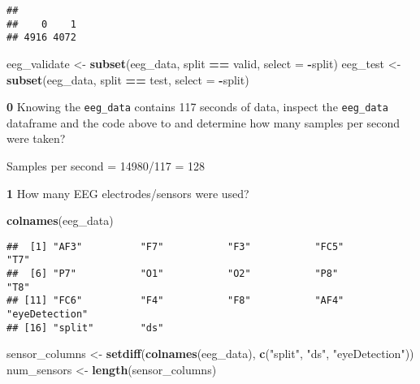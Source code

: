 \documentclass[
]{article}
\newenvironment{Shaded}{\begin{snugshade}}{\end{snugshade}}
\newcommand{\AttributeTok}[1]{\textcolor[rgb]{0.13,0.29,0.53}{#1}}
\newcommand{\FunctionTok}[1]{\textcolor[rgb]{0.13,0.29,0.53}{\textbf{#1}}}
\newcommand{\NormalTok}[1]{#1}
\newcommand{\OtherTok}[1]{\textcolor[rgb]{0.56,0.35,0.01}{#1}}
\newcommand{\SpecialCharTok}[1]{\textcolor[rgb]{0.81,0.36,0.00}{\textbf{#1}}}
\newcommand{\StringTok}[1]{\textcolor[rgb]{0.31,0.60,0.02}{#1}}
\begin{document}
\begin{verbatim}
## 
##    0    1 
## 4916 4072
\end{verbatim}

\begin{Shaded}
\begin{Highlighting}[]
\NormalTok{eeg\_validate }\OtherTok{\textless{}{-}} \FunctionTok{subset}\NormalTok{(eeg\_data, split }\SpecialCharTok{==} \StringTok{\textquotesingle{}valid\textquotesingle{}}\NormalTok{, }\AttributeTok{select =} \SpecialCharTok{{-}}\NormalTok{split)}
\NormalTok{eeg\_test }\OtherTok{\textless{}{-}} \FunctionTok{subset}\NormalTok{(eeg\_data, split }\SpecialCharTok{==} \StringTok{\textquotesingle{}test\textquotesingle{}}\NormalTok{, }\AttributeTok{select =} \SpecialCharTok{{-}}\NormalTok{split)}
\end{Highlighting}
\end{Shaded}

\textbf{0} Knowing the \texttt{eeg\_data} contains 117 seconds of data,
inspect the \texttt{eeg\_data} dataframe and the code above to and
determine how many samples per second were taken?

Samples per second = 14980/117 = 128

\textbf{1} How many EEG electrodes/sensors were used?

\begin{Shaded}
\begin{Highlighting}[]
\FunctionTok{colnames}\NormalTok{(eeg\_data)}
\end{Highlighting}
\end{Shaded}

\begin{verbatim}
##  [1] "AF3"          "F7"           "F3"           "FC5"          "T7"          
##  [6] "P7"           "O1"           "O2"           "P8"           "T8"          
## [11] "FC6"          "F4"           "F8"           "AF4"          "eyeDetection"
## [16] "split"        "ds"
\end{verbatim}

\begin{Shaded}
\begin{Highlighting}[]
\NormalTok{sensor\_columns }\OtherTok{\textless{}{-}} \FunctionTok{setdiff}\NormalTok{(}\FunctionTok{colnames}\NormalTok{(eeg\_data), }\FunctionTok{c}\NormalTok{(}\StringTok{"split"}\NormalTok{, }\StringTok{"ds"}\NormalTok{, }\StringTok{"eyeDetection"}\NormalTok{))}
\NormalTok{num\_sensors }\OtherTok{\textless{}{-}} \FunctionTok{length}\NormalTok{(sensor\_columns)}
\end{Highlighting}
\end{Shaded}
\end{document}
